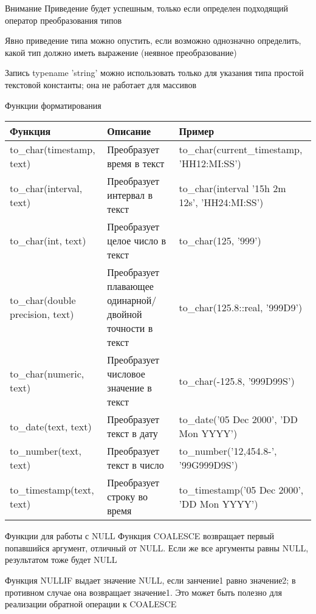 \documentclass[12pt]{article}
\begin{document}
\begin{Remark}{Внимание}
    Приведение будет успешным, только если определен подходящий оператор преобразования типов 

    Явно приведение типа можно опустить, если возможно однозначно определить, какой тип должно иметь выражение (неявное преобразование)

    Запись typename 'string' можно использовать только для указания типа простой текстовой константы; она не работает для массивов 
\end{Remark}

\begin{nota}{Функции форматирования}
    \begin{center}
        \begin{tabular}{|m{9em}|m{12em}|m{15em}|}
            \hline
            Функция & Описание & Пример \\
            \hline
            to\_char(timestamp, text) & Преобразует время в текст & to\_char(current\_timestamp, 'HH12:MI:SS') \\
            \hline
            to\_char(interval, text) & Преобразует интервал в текст & to\_char(interval '15h 2m 12s', 'HH24:MI:SS') \\
            \hline
            to\_char(int, text) & Преобразует целое число в текст & to\_char(125, '999') \\
            \hline
            to\_char(double precision, text) & Преобразует плавающее одинарной/двойной точности в текст & to\_char(125.8::real, '999D9') \\
            \hline
            to\_char(numeric, text) & Преобразует числовое значение в текст & to\_char(-125.8, '999D99S') \\
            \hline 
            to\_date(text, text) & Преобразует текст в дату & to\_date('05 Dec 2000', 'DD Mon YYYY') \\
            \hline
            to\_number(text, text) & Преобразует текст в число & to\_number('12,454.8-', '99G999D9S') \\
            \hline
            to\_timestamp(text, text) & Преобразует строку во время & to\_timestamp('05 Dec 2000', 'DD Mon YYYY') \\
            \hline
        \end{tabular}
    \end{center}
\end{nota}

\begin{defin}{Функции для работы с NULL}
    Функция COALESCE возвращает первый попавшийся аргумент, отличный от NULL. Если же все аргументы равны NULL, результатом тоже будет NULL 

    Функция NULLIF выдает значение NULL, если занчение1 равно значение2; в противном случае она возвращает значение1. Это может быть полезно для реализации обратной операции к COALESCE
\end{defin}
\end{document}
